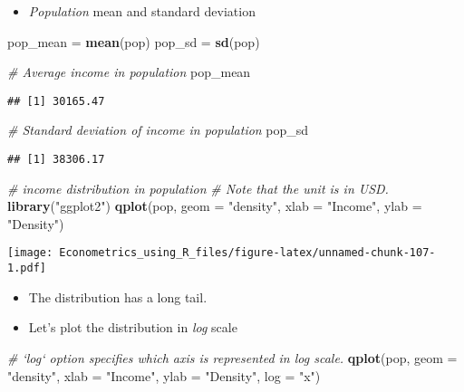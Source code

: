 \documentclass[]{book}
\newenvironment{Shaded}{\begin{snugshade}}{\end{snugshade}}
\newcommand{\KeywordTok}[1]{\textcolor[rgb]{0.13,0.29,0.53}{\textbf{#1}}}
\newcommand{\DataTypeTok}[1]{\textcolor[rgb]{0.13,0.29,0.53}{#1}}
\newcommand{\StringTok}[1]{\textcolor[rgb]{0.31,0.60,0.02}{#1}}
\newcommand{\CommentTok}[1]{\textcolor[rgb]{0.56,0.35,0.01}{\textit{#1}}}
\newcommand{\NormalTok}[1]{#1}
\providecommand{\tightlist}{%
  \setlength{\itemsep}{0pt}\setlength{\parskip}{0pt}}
\begin{document}
\begin{itemize}
\tightlist
\item
  \emph{Population} mean and standard deviation
\end{itemize}

\begin{Shaded}
\begin{Highlighting}[]
\NormalTok{pop_mean =}\StringTok{ }\KeywordTok{mean}\NormalTok{(pop)}
\NormalTok{pop_sd   =}\StringTok{ }\KeywordTok{sd}\NormalTok{(pop)}

\CommentTok{# Average income in population}
\NormalTok{pop_mean}
\end{Highlighting}
\end{Shaded}

\begin{verbatim}
## [1] 30165.47
\end{verbatim}

\begin{Shaded}
\begin{Highlighting}[]
\CommentTok{# Standard deviation of income in population}
\NormalTok{pop_sd}
\end{Highlighting}
\end{Shaded}

\begin{verbatim}
## [1] 38306.17
\end{verbatim}

\begin{Shaded}
\begin{Highlighting}[]
\CommentTok{# income distribution in population}
\CommentTok{# Note that the unit is in USD.}
\KeywordTok{library}\NormalTok{(}\StringTok{"ggplot2"}\NormalTok{)}
\KeywordTok{qplot}\NormalTok{(pop, }\DataTypeTok{geom =} \StringTok{"density"}\NormalTok{, }
      \DataTypeTok{xlab =} \StringTok{"Income"}\NormalTok{,}
      \DataTypeTok{ylab =} \StringTok{"Density"}\NormalTok{)}
\end{Highlighting}
\end{Shaded}

\texttt{[image: Econometrics\_using\_R\_files/figure-latex/unnamed-chunk-107-1.pdf]}

\begin{itemize}
\tightlist
\item
  The distribution has a long tail.
\item
  Let's plot the distribution in \emph{log} scale
\end{itemize}

\begin{Shaded}
\begin{Highlighting}[]
\CommentTok{# `log` option specifies which axis is represented in log scale.}
\KeywordTok{qplot}\NormalTok{(pop, }\DataTypeTok{geom =} \StringTok{"density"}\NormalTok{, }
      \DataTypeTok{xlab =} \StringTok{"Income"}\NormalTok{,}
      \DataTypeTok{ylab =} \StringTok{"Density"}\NormalTok{,}
      \DataTypeTok{log =} \StringTok{"x"}\NormalTok{)}
\end{Highlighting}
\end{Shaded}
\end{document}
